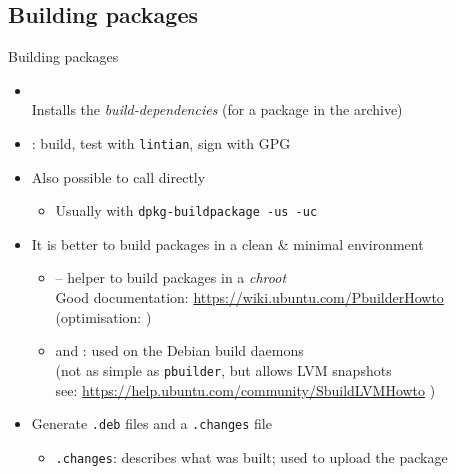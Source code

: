\documentclass[10pt,final]{beamer}
\begin{document}
\subsection{Building packages}
\begin{frame}{Building packages}
  \begin{itemize}
  \item {}\\
    Installs the \textsl{build-dependencies} (for a package in the archive)
    
    \br
  \item {}: build, test with \texttt{lintian}, sign with GPG
    \br
  \item Also possible to call  directly
    \begin{itemize}
    \item Usually with \texttt{dpkg-buildpackage -us -uc}
    \end{itemize}
    \br
  \item It is better to build packages in a clean \& minimal environment
    \begin{itemize}
    \item {} -- helper to build packages in a \textsl{chroot}\\
      Good documentation: \url{https://wiki.ubuntu.com/PbuilderHowto}\\
      (optimisation:   )
      \hbr
    \item {} and : used on the Debian build daemons\\
      (not as simple as \texttt{pbuilder}, but allows LVM snapshots\\
       see: \url{https://help.ubuntu.com/community/SbuildLVMHowto} )
    \end{itemize}
    \br
  \item Generate \texttt{.deb} files and a \texttt{.changes} file
    \begin{itemize}
    \item \texttt{.changes}: describes what was built; used to upload the package
    \end{itemize}
  \end{itemize}
\end{frame}
\end{document}
